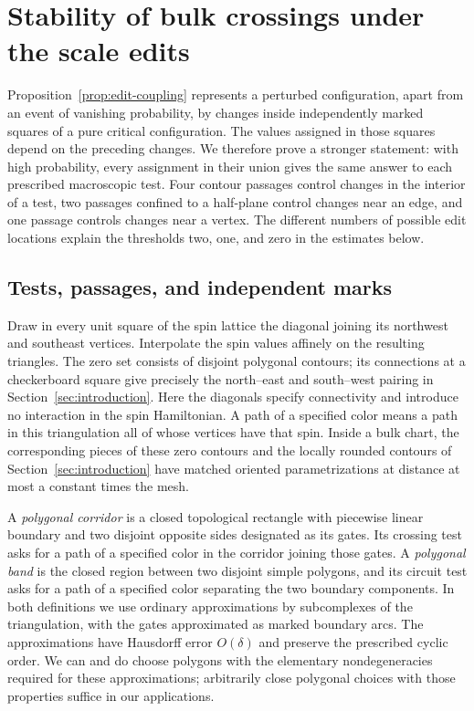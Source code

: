\section{Stability of bulk crossings under the scale edits}
\label{sec:stability}

Proposition~\ref{prop:edit-coupling} represents a perturbed configuration,
apart from an event of vanishing probability, by changes inside independently
marked squares of a pure critical configuration.  The values assigned in
those squares depend on the preceding changes.  We therefore prove a
stronger statement: with high probability, every assignment in their union
gives the same answer to each prescribed macroscopic test.  Four contour
passages control changes in the interior of a test, two passages confined to
a half-plane control changes near an edge, and one passage controls changes
near a vertex.  The different numbers of possible edit locations explain
the thresholds two, one, and zero in the estimates below.

\subsection{Tests, passages, and independent marks}

Draw in every unit square of the spin lattice the diagonal joining its
northwest and southeast vertices.  Interpolate the spin values affinely on
the resulting triangles.  The zero set consists of disjoint polygonal
contours; its connections at a checkerboard square give precisely the
north--east and south--west pairing in Section~\ref{sec:introduction}.
Here the diagonals specify connectivity and introduce no interaction in
the spin Hamiltonian.  A path of a specified color means a path in this
triangulation all of whose vertices have that spin.  Inside a bulk chart,
the corresponding pieces of these zero contours and the locally rounded
contours of Section~\ref{sec:introduction} have matched oriented
parametrizations at distance at most a constant times the mesh.

A \emph{polygonal corridor} is a closed topological rectangle with
piecewise linear boundary and two disjoint opposite sides designated as
its gates.  Its crossing test asks for a path of a specified color in the
corridor joining those gates.  A \emph{polygonal band} is the closed region
between two disjoint simple polygons, and its circuit test asks for a path
of a specified color separating the two boundary components.  In both
definitions we use ordinary approximations by subcomplexes of the
triangulation, with the gates approximated as marked boundary arcs.  The
approximations have Hausdorff error $O(\delta)$ and preserve the prescribed
cyclic order.  We can and do choose polygons with the elementary
nondegeneracies required for these approximations; arbitrarily close
polygonal choices with those properties suffice in our applications.

